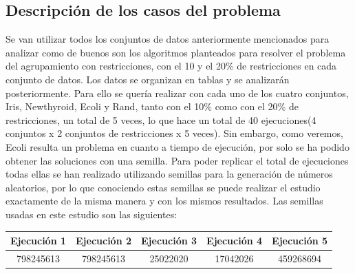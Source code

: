 \documentclass{article}
\begin{document}
	\subsection{Descripción de los casos del problema}
	Se van utilizar todos los conjuntos de datos anteriormente mencionados para analizar como de buenos son los algoritmos planteados para resolver el problema del agrupamiento con restricciones, con el 10 y el 20\% de restricciones en cada conjunto de datos. Los datos se organizan en tablas y se analizarán posteriormente. Para ello se quería realizar con cada uno de los cuatro conjuntos, Iris, Newthyroid, Ecoli y Rand,
	tanto con el 10\% como con el 20\% de restricciones, un total de 5 veces, lo que hace un total de 40 ejecuciones(4 conjuntos x 2 conjuntos de restricciones x 5 veces). Sin embargo, como veremos, Ecoli resulta un problema en cuanto a tiempo de ejecución, por solo se ha podido obtener las soluciones con una semilla. Para poder replicar el total de ejecuciones todas ellas se han realizado utilizando semillas para la generación de números aleatorios, por lo que conociendo estas semillas se puede realizar el estudio exactamente de la misma manera y con los mismos resultados. Las semillas usadas en este estudio son las siguientes:\par
	{\centering
	\begin{tabular}{|c|c|c|c|c|}
		\hline
		Ejecución 1 & Ejecución 2 & Ejecución 3 & Ejecución 4 & Ejecución 5 \\
		\hline
		798245613 & 798245613 & 25022020 & 17042026 & 459268694 \\
		\hline
	\end{tabular}
	\par}
\end{document}

